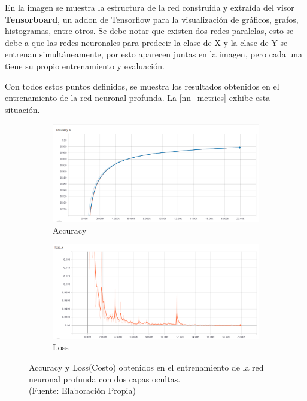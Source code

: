 En la imagen se muestra la estructura de la red construida y extraída del visor \textbf{Tensorboard}, un addon de Tensorflow para la visualización de gráficos, grafos, histogramas, entre otros. Se debe notar que existen dos redes paralelas, esto se debe a que las redes neuronales para predecir la clase de X y la clase de Y se entrenan simultáneamente, por esto aparecen juntas en la imagen, pero cada una tiene su propio entrenamiento y evaluación.

Con todos estos puntos definidos, se muestra los resultados obtenidos en el entrenamiento de la red neuronal profunda. La \autoref{nn_metrics} exhibe esta situación.


\begin{figure}[ht!]
\centering
\begin{subfigure}{.5\textwidth}
  \centering
  \includegraphics[width=.8\linewidth]{figures/nn_plot.png}
  \caption{Accuracy}
  \label{fig:sub1}
\end{subfigure}%
\begin{subfigure}{.5\textwidth}
  \centering
  \includegraphics[width=.8\linewidth]{figures/nn_loss.png}
  \caption{Loss}
  \label{fig:sub2}
\end{subfigure}
\caption[Accuracy y Loss(Costo) obtenidos en el entrenamiento de la red neuronal profunda]{Accuracy y Loss(Costo) obtenidos en el entrenamiento de la red neuronal profunda con dos capas ocultas. \\
{\scriptsize (Fuente: Elaboración Propia)}}
\label{fig:nn_metrics}
\end{figure}

